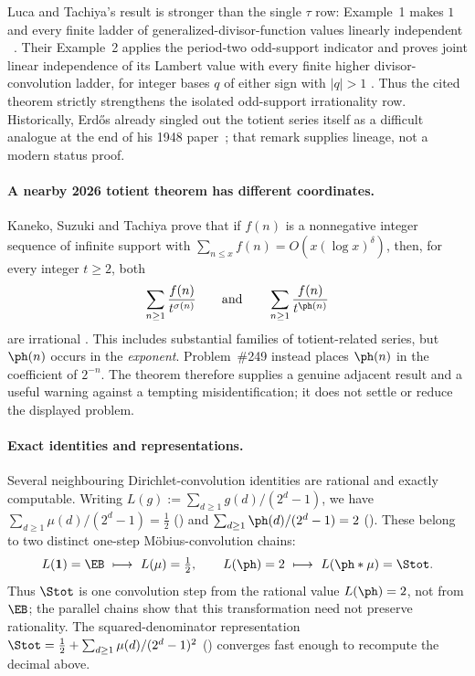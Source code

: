 Luca and Tachiya's result is stronger than the single $\tau$ row:
Example~1 makes \(1\) and every finite ladder of generalized-divisor-function
values linearly independent
~\cite[Example~1, p.~140; proof pp.~149--150]{lucatachiya2017}.
Their Example~2 applies the period-two odd-support indicator and proves joint
linear independence of its Lambert value with every finite higher
divisor-convolution ladder, for integer bases \(q\) of either sign with
\(|q|>1\) \cite[Example~2, p.~140]{lucatachiya2017}. Thus the cited theorem
strictly strengthens the isolated odd-support irrationality row.
Historically, Erd\H{o}s already singled out the totient series itself as a
difficult analogue at the end of his 1948 paper~\cite[p.~66]{erdos1948};
that remark supplies lineage, not a modern status proof.

\paragraph{A nearby 2026 totient theorem has different coordinates.}
Kaneko, Suzuki and Tachiya prove that if \(f(n)\) is a nonnegative integer
sequence of infinite support with
\(\sum_{n\le x}f(n)=O(x(\log x)^\delta)\), then, for every integer
\(t\ge2\), both
\[
  \sum_{n\ge1}\frac{f(n)}{t^{\sigma(n)}}
  \qquad\text{and}\qquad
  \sum_{n\ge1}\frac{f(n)}{t^{\ph(n)}}
\]
are irrational
\cite[Corollary~3, pp.~5--6; proof pp.~18--19]{kanekosuzukitachiya2026}.
This includes substantial families of totient-related series, but
\(\ph(n)\) occurs in the \emph{exponent}.  Problem~\#249 instead places
\(\ph(n)\) in the coefficient of \(2^{-n}\).  The theorem therefore supplies
a genuine adjacent result and a useful warning against a tempting
misidentification; it does not settle or reduce the displayed problem.

\paragraph{Exact identities and representations.}
Several neighbouring Dirichlet-convolution identities are rational and
exactly computable.  Writing $L(g):=\sum_{d\ge1}g(d)/(2^d-1)$, we have
$\sum_{d\ge1}\mu(d)/(2^d-1)=\tfrac12$
()
and $\sum_{d\ge1}\ph(d)/(2^d-1)=2$
().
These belong to two distinct one-step M\"obius-convolution chains:
\[
  L(\mathbf 1)=\EB \ \longmapsto\ L(\mu)=\tfrac12,
  \qquad
  L(\ph)=2 \ \longmapsto\ L(\ph*\mu)=\Stot.
\]
Thus $\Stot$ is one convolution step from the rational value $L(\ph)=2$, not
from $\EB$; the parallel chains show that this transformation need not
preserve rationality.  The squared-denominator representation
$\Stot=\tfrac12+\sum_{d\ge1}\mu(d)/(2^d-1)^2$
()
converges fast enough to recompute the decimal above.

